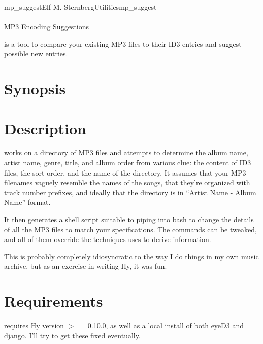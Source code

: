 \documentclass[english]{article}
\begin{document}
\begin{Name}{1}{mp\_suggest}{Elf M. Sternberg}{Utilities}{mp\_suggest \\--\\ MP3 Encoding Suggestions}

   is a tool to compare your existing MP3 files to
  their ID3 entries and suggest possible new entries.

\end{Name}

\section{Synopsis}

 

\section{Description}

 works on a directory of MP3 files and attempts to
determine the album name, artist name, genre, title, and album order
from various clue: the content of ID3 files, the sort order, and the
name of the directory.  It assumes that your MP3 filenames vaguely
resemble the names of the songs, that they're organized with track
number prefixes, and ideally that the directory is in ``Artist Name -
Album Name'' format.

It then generates a shell script suitable to piping into bash to change
the details of all the MP3 files to match your specifications.  The
commands can be tweaked, and all of them override the techniques
 uses to derive information.

This is probably completely idiosyncratic to the way I do things in my
own music archive, but as an exercise in writing Hy, it was fun.

\section{Requirements}

\begin{description}\setlength{\itemsep}{1cm}
\item[Hy]  requires Hy version $>=$ 0.10.0, as well as
  a local install of both eyeD3 and django.  I'll try to get these
  fixed eventually.

\end{description}
\end{document}
